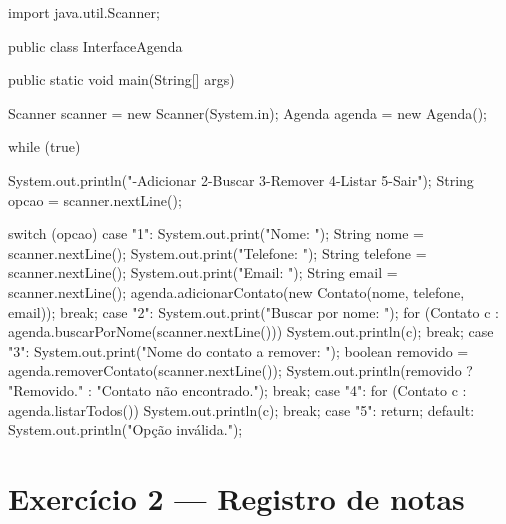 \documentclass[11pt,a4paper]{article}
\begin{document}
\begin{javacode}
import java.util.Scanner;

public class InterfaceAgenda {
    public static void main(String[] args) {
        Scanner scanner = new Scanner(System.in);
        Agenda agenda = new Agenda();

        while (true) {
            System.out.println("-Adicionar 2-Buscar 3-Remover 4-Listar 5-Sair");
            String opcao = scanner.nextLine();

            switch (opcao) {
                case "1":
                    System.out.print("Nome: ");
                    String nome = scanner.nextLine();
                    System.out.print("Telefone: ");
                    String telefone = scanner.nextLine();
                    System.out.print("Email: ");
                    String email = scanner.nextLine();
                    agenda.adicionarContato(new Contato(nome, telefone, email));
                    break;
                case "2":
                    System.out.print("Buscar por nome: ");
                    for (Contato c : agenda.buscarPorNome(scanner.nextLine())) {
                        System.out.println(c);
                    }
                    break;
                case "3":
                    System.out.print("Nome do contato a remover: ");
                    boolean removido = agenda.removerContato(scanner.nextLine());
                    System.out.println(removido ? "Removido." : "Contato não encontrado.");
                    break;
                case "4":
                    for (Contato c : agenda.listarTodos()) {
                        System.out.println(c);
                    }
                    break;
                case "5":
                    return;
                default:
                    System.out.println("Opção inválida.");
            }
        }
    }
}
\end{javacode}

\section{Exercício 2 --- Registro de notas}
\end{document}
